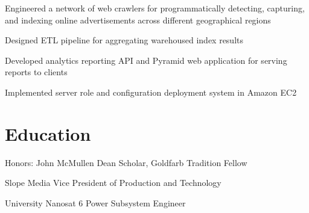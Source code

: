 \documentclass[]{resume-openfont}
\begin{document}
    \begin{tightemize}
        \item
            Engineered a network of web crawlers for programmatically
            detecting, capturing, and indexing online advertisements across
            different geographical regions
        \item
            Designed ETL pipeline for aggregating warehoused index results
        \item
            Developed analytics reporting API and Pyramid web application for
            serving reports to clients
        \item
            Implemented server role and configuration deployment system in
            Amazon EC2
    \end{tightemize}

\section{Education}
    \begin{tightemize}
    \item
        Honors: John McMullen Dean Scholar, Goldfarb Tradition Fellow
    \item
        Slope Media Vice President of Production and Technology
    \item
        University Nanosat 6 Power Subsystem Engineer
    \end{tightemize}
\end{document}
